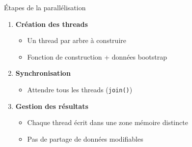 \documentclass{beamer}
\begin{document}
	\begin{frame}{Étapes de la parallélisation}
		\begin{enumerate}
			\item<1-> \textbf{Création des threads}
			\begin{itemize}
				\item<1-> Un thread par arbre à construire
				\item<1-> Fonction de construction + données bootstrap
			\end{itemize}
			
			\item<2-> \textbf{Synchronisation}
			\begin{itemize}
				\item<2-> Attendre tous les threads (\texttt{join()})
			\end{itemize}
			
			\item<3-> \textbf{Gestion des résultats}
			\begin{itemize}
				  \item<3-> Chaque thread écrit dans une zone mémoire distincte
				  \item<3-> Pas de partage de données modifiables
				\end{itemize}
		\end{enumerate}
		
	\end{frame}
	
\end{document}
